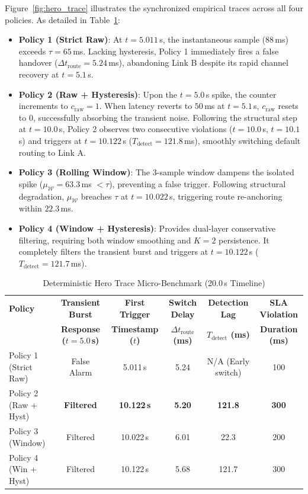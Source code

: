 \documentclass[conference]{IEEEtran}
\begin{document}
Figure~\ref{fig:hero_trace} illustrates the synchronized empirical traces across all four policies. As detailed in Table~\ref{tab:hero_trace_metrics}:
\begin{itemize}
    \item \textbf{Policy 1 (Strict Raw)}: At $t = 5.011$\,s, the instantaneous sample ($88$\,ms) exceeds $\tau = 65$\,ms. Lacking hysteresis, Policy 1 immediately fires a false handover ($\Delta t_{\text{route}} = 5.24$\,ms), abandoning Link B despite its rapid channel recovery at $t = 5.1$\,s.
    \item \textbf{Policy 2 (Raw + Hysteresis)}: Upon the $t = 5.0$\,s spike, the counter increments to $c_{\text{raw}} = 1$. When latency reverts to $50$\,ms at $t = 5.1$\,s, $c_{\text{raw}}$ resets to 0, successfully absorbing the transient noise. Following the structural step at $t = 10.0$\,s, Policy 2 observes two consecutive violations ($t = 10.0$\,s, $t = 10.1$\,s) and triggers at $t = 10.122$\,s ($T_{\text{detect}} = 121.8$\,ms), smoothly switching default routing to Link A.
    \item \textbf{Policy 3 (Rolling Window)}: The 3-sample window dampens the isolated spike ($\mu_{\mathcal{W}} = 63.3$\,ms $<\tau$), preventing a false trigger. Following structural degradation, $\mu_{\mathcal{W}}$ breaches $\tau$ at $t = 10.022$\,s, triggering route re-anchoring within $22.3$\,ms.
    \item \textbf{Policy 4 (Window + Hysteresis)}: Provides dual-layer conservative filtering, requiring both window smoothing and $K=2$ persistence. It completely filters the transient burst and triggers at $t = 10.122$\,s ($T_{\text{detect}} = 121.7$\,ms).
\end{itemize}

\begin{table}[htbp]
\caption{Deterministic Hero Trace Micro-Benchmark (20.0\,s Timeline)}
\label{tab:hero_trace_metrics}
\centering
\begin{tabular}{lccccc}
\toprule
\textbf{Policy} & \textbf{Transient Burst} & \textbf{First Trigger} & \textbf{Switch Delay} & \textbf{Detection Lag} & \textbf{SLA Violation} \\
& \textbf{Response ($t=5.0$\,s)} & \textbf{Timestamp ($t$)} & \textbf{$\Delta t_{\text{route}}$ (ms)} & \textbf{$T_{\text{detect}}$ (ms)} & \textbf{Duration (ms)} \\
\midrule
Policy 1 (Strict Raw)    & False Alarm          & 5.011\,s          & 5.24       & N/A (Early switch) & 100 \\
Policy 2 (Raw + Hyst)    & \textbf{Filtered}    & \textbf{10.122\,s} & \textbf{5.20} & \textbf{121.8}     & \textbf{300} \\
Policy 3 (Window)        & Filtered             & 10.022\,s          & 6.01       & 22.3               & 200 \\
Policy 4 (Win + Hyst)    & Filtered             & 10.122\,s          & 5.68       & 121.7              & 300 \\
\bottomrule
\end{tabular}
\end{table}
\end{document}

